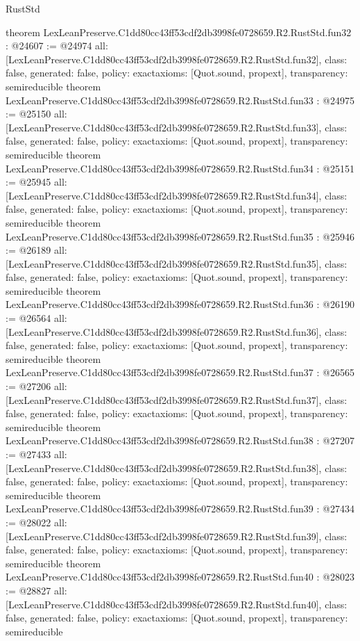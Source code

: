 \begin{lexlean}{RustStd}
\begin{coremodule}
{}
theorem LexLeanPreserve.C1dd80cc43ff53cdf2db3998fe0728659.R2.RustStd.fun32 : @24607 := @24974 {
  all: [LexLeanPreserve.C1dd80cc43ff53cdf2db3998fe0728659.R2.RustStd.fun32],
  class: false,
  generated: false,
  policy: exact{axioms: [Quot.sound, propext]},
  transparency: semireducible
}
theorem LexLeanPreserve.C1dd80cc43ff53cdf2db3998fe0728659.R2.RustStd.fun33 : @24975 := @25150 {
  all: [LexLeanPreserve.C1dd80cc43ff53cdf2db3998fe0728659.R2.RustStd.fun33],
  class: false,
  generated: false,
  policy: exact{axioms: [Quot.sound, propext]},
  transparency: semireducible
}
theorem LexLeanPreserve.C1dd80cc43ff53cdf2db3998fe0728659.R2.RustStd.fun34 : @25151 := @25945 {
  all: [LexLeanPreserve.C1dd80cc43ff53cdf2db3998fe0728659.R2.RustStd.fun34],
  class: false,
  generated: false,
  policy: exact{axioms: [Quot.sound, propext]},
  transparency: semireducible
}
theorem LexLeanPreserve.C1dd80cc43ff53cdf2db3998fe0728659.R2.RustStd.fun35 : @25946 := @26189 {
  all: [LexLeanPreserve.C1dd80cc43ff53cdf2db3998fe0728659.R2.RustStd.fun35],
  class: false,
  generated: false,
  policy: exact{axioms: [Quot.sound, propext]},
  transparency: semireducible
}
theorem LexLeanPreserve.C1dd80cc43ff53cdf2db3998fe0728659.R2.RustStd.fun36 : @26190 := @26564 {
  all: [LexLeanPreserve.C1dd80cc43ff53cdf2db3998fe0728659.R2.RustStd.fun36],
  class: false,
  generated: false,
  policy: exact{axioms: [Quot.sound, propext]},
  transparency: semireducible
}
theorem LexLeanPreserve.C1dd80cc43ff53cdf2db3998fe0728659.R2.RustStd.fun37 : @26565 := @27206 {
  all: [LexLeanPreserve.C1dd80cc43ff53cdf2db3998fe0728659.R2.RustStd.fun37],
  class: false,
  generated: false,
  policy: exact{axioms: [Quot.sound, propext]},
  transparency: semireducible
}
theorem LexLeanPreserve.C1dd80cc43ff53cdf2db3998fe0728659.R2.RustStd.fun38 : @27207 := @27433 {
  all: [LexLeanPreserve.C1dd80cc43ff53cdf2db3998fe0728659.R2.RustStd.fun38],
  class: false,
  generated: false,
  policy: exact{axioms: [Quot.sound, propext]},
  transparency: semireducible
}
theorem LexLeanPreserve.C1dd80cc43ff53cdf2db3998fe0728659.R2.RustStd.fun39 : @27434 := @28022 {
  all: [LexLeanPreserve.C1dd80cc43ff53cdf2db3998fe0728659.R2.RustStd.fun39],
  class: false,
  generated: false,
  policy: exact{axioms: [Quot.sound, propext]},
  transparency: semireducible
}
theorem LexLeanPreserve.C1dd80cc43ff53cdf2db3998fe0728659.R2.RustStd.fun40 : @28023 := @28827 {
  all: [LexLeanPreserve.C1dd80cc43ff53cdf2db3998fe0728659.R2.RustStd.fun40],
  class: false,
  generated: false,
  policy: exact{axioms: [Quot.sound, propext]},
  transparency: semireducible
}
\end{coremodule}
\end{lexlean}
